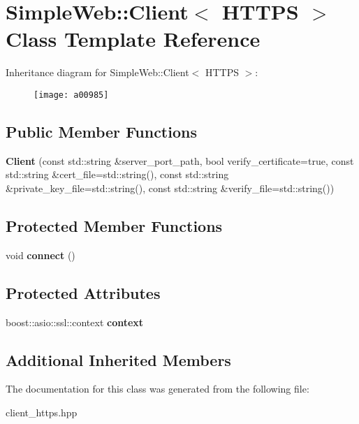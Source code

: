 \hypertarget{a00985}{}\section{Simple\+Web\+:\+:Client$<$ H\+T\+T\+PS $>$ Class Template Reference}
\label{a00985}
Inheritance diagram for Simple\+Web\+:\+:Client$<$ H\+T\+T\+PS $>$\+:\begin{figure}[H]
\begin{center}
\leavevmode
\texttt{[image: a00985]}
\end{center}
\end{figure}
\subsection*{Public Member Functions}
\begin{DoxyCompactItemize}
\item 
\mbox{\label{a00985_abd87d3dc08c9fed3a60f18c749b8bacd}} 
{\bfseries Client} (const std\+::string \&server\+\_\+port\+\_\+path, bool verify\+\_\+certificate=true, const std\+::string \&cert\+\_\+file=std\+::string(), const std\+::string \&private\+\_\+key\+\_\+file=std\+::string(), const std\+::string \&verify\+\_\+file=std\+::string())
\end{DoxyCompactItemize}
\subsection*{Protected Member Functions}
\begin{DoxyCompactItemize}
\item 
\mbox{\label{a00985_a833f6fd136e3158b873bee024d6e188c}} 
void {\bfseries connect} ()
\end{DoxyCompactItemize}
\subsection*{Protected Attributes}
\begin{DoxyCompactItemize}
\item 
\mbox{\label{a00985_afe57679cc6153d5d1fe8abc94a8fa58a}} 
boost\+::asio\+::ssl\+::context {\bfseries context}
\end{DoxyCompactItemize}
\subsection*{Additional Inherited Members}


The documentation for this class was generated from the following file\+:\begin{DoxyCompactItemize}
\item 
client\+\_\+https.\+hpp\end{DoxyCompactItemize}
